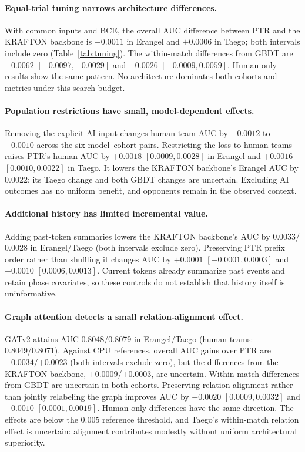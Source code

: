\documentclass[sigconf,anonymous,nonacm]{acmart}
\begin{document}
\paragraph{Equal-trial tuning narrows architecture differences.}
With common inputs and BCE, the overall AUC difference between PTR and the KRAFTON backbone is $-0.0011$ in Erangel and $+0.0006$ in Taego; both intervals include zero (Table~\ref{tab:tuning}). The within-match differences from GBDT are $-0.0062$ $[-0.0097,\allowbreak -0.0029]$ and $+0.0026$ $[-0.0009,\allowbreak 0.0059]$. Human-only results show the same pattern. No architecture dominates both cohorts and metrics under this search budget.


\paragraph{Population restrictions have small, model-dependent effects.}
Removing the explicit AI input changes human-team AUC by $-0.0012$ to $+0.0010$ across the six model--cohort pairs. Restricting the loss to human teams raises PTR's human AUC by $+0.0018$ $[0.0009,\allowbreak 0.0028]$ in Erangel and $+0.0016$ $[0.0010,\allowbreak 0.0022]$ in Taego. It lowers the KRAFTON backbone's Erangel AUC by $0.0022$; its Taego change and both GBDT changes are uncertain. Excluding AI outcomes has no uniform benefit, and opponents remain in the observed context.

\paragraph{Additional history has limited incremental value.}
Adding past-token summaries lowers the KRAFTON backbone's AUC by $0.0033$/$0.0028$ in Erangel/Taego (both intervals exclude zero). Preserving PTR prefix order rather than shuffling it changes AUC by $+0.0001$ $[-0.0001,\allowbreak 0.0003]$ and $+0.0010$ $[0.0006,\allowbreak 0.0013]$. Current tokens already summarize past events and retain phase covariates, so these controls do not establish that history itself is uninformative.

\paragraph{Graph attention detects a small relation-alignment effect.}
GATv2 attains AUC 0.8048/0.8079 in Erangel/Taego (human teams: 0.8049/0.8071). Against CPU references, overall AUC gains over PTR are $+0.0034$/$+0.0023$ (both intervals exclude zero), but the differences from the KRAFTON backbone, $+0.0009$/$+0.0003$, are uncertain. Within-match differences from GBDT are uncertain in both cohorts. Preserving relation alignment rather than jointly relabeling the graph improves AUC by $+0.0020$ $[0.0009,\allowbreak 0.0032]$ and $+0.0010$ $[0.0001,\allowbreak 0.0019]$. Human-only differences have the same direction. The effects are below the 0.005 reference threshold, and Taego's within-match relation effect is uncertain: alignment contributes modestly without uniform architectural superiority.
\end{document}

